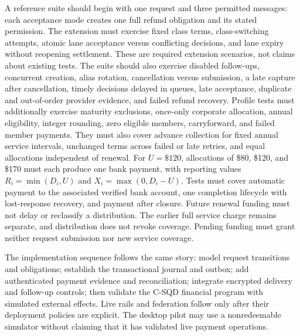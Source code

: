 \documentclass[11pt]{article}
\begin{document}
A reference suite should begin with one request and three permitted messages:
each acceptance mode creates one full refund obligation and its stated permission.
The extension must exercise fixed class terms, class-switching attempts, atomic
lane acceptance versus conflicting decisions, and lane expiry without reopening
settlement. These are required extension scenarios, not claims about existing tests.
The suite should also
exercise disabled follow-ups, concurrent creation, alias rotation, cancellation
versus submission, a late capture after cancellation, timely decisions delayed in
queues, late acceptance, duplicate and out-of-order provider evidence, and failed
refund recovery. Profile tests must additionally exercise maturity exclusions,
once-only corporate allocation, annual eligibility, integer rounding, zero
eligible members, carryforward, and failed member payments. They must also cover
advance collection for fixed annual service intervals, unchanged terms across
failed or late retries, and equal allocations independent of renewal. For
$U=\$120$, allocations of \$80, \$120, and \$170 must each produce one bank
payment, with reporting values $R_i=\min(D_i,U)$ and $X_i=\max(0,D_i-U)$.
Tests must cover automatic payment to the associated verified bank account,
one completion lifecycle with lost-response recovery, and payment after closure.
Future renewal funding must not delay or reclassify a distribution. The earlier
full service charge remains separate, and distribution does not revoke coverage.
Pending funding must grant neither request submission nor new service coverage.

The implementation sequence follows the same story: model request transitions
and obligations; establish the transactional journal and outbox; add authenticated
payment evidence and reconciliation; integrate encrypted delivery and follow-up
controls; then validate the C-SQD financial program with simulated external
effects. Live rails and federation follow only after their deployment policies
are explicit. The desktop pilot may use a nonredeemable simulator without
claiming that it has validated live payment operations.
\end{document}
